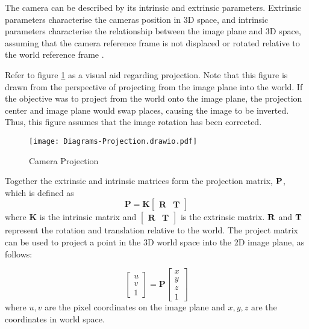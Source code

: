         The camera can be described by its intrinsic and extrinsic parameters. Extrinsic parameters characterise the cameras position in 3D space, and intrinsic parameters characterise the relationship between the image plane and 3D space, assuming that the camera reference frame is not displaced or rotated relative to the world reference frame \citep{hartley2003multiple}.

        Refer to figure \ref{fig:projection} as a visual aid regarding projection. Note that this figure is drawn from the perspective of projecting from the image plane into the world. If the objective was to project from the world onto the image plane, the projection center and image plane would swap places, causing the image to be inverted. Thus, this figure assumes that the image rotation has been corrected.
        \begin{figure}[h]
            \centering
            \texttt{[image: Diagrams-Projection.drawio.pdf]}
            \caption{Camera Projection}
            \label{fig:projection}
        \end{figure}

        \newpage
        \noindent
        Together the extrinsic and intrinsic matrices form the projection matrix, \(\bf{P}\), which is defined as
        \begin{equation} \label{eq:projection_matrix}
            \bm{P} = \bm{K}
            \begin{bmatrix}
                \bm{R} & \bm{T}
            \end{bmatrix}
        \end{equation}
        where \(\bm{K}\) is the intrinsic matrix and \(\begin{bmatrix} \bm{R} & \bm{T} \end{bmatrix}\) is the extrinsic matrix. \(\bf{R}\) and \(\bf{T}\) represent the rotation and translation relative to the world.
        The project matrix can be used to project a point in the 3D world space into the 2D image plane, as follows:

        \begin{equation} \label{eq:full_projection}
            \begin{bmatrix}
                u \\
                v \\
                1
            \end{bmatrix}
            = \bm{P}
            \begin{bmatrix}
                x \\
                y \\
                z \\
                1
            \end{bmatrix}
        \end{equation}
        where \(u,v\) are the pixel coordinates on the image plane and \(x,y,z\) are the coordinates in world space.

